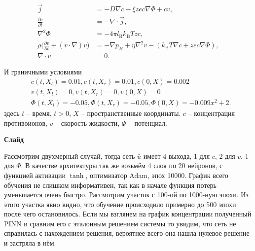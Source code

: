 \documentclass[a4paper,14pt]{extarticle} %
\begin{document}
\begin{equation*}\label{eq:ek_eq}
    \begin{aligned}
        \vec{j}                                             & =
        -D \nabla c - \xi z e c \nabla \Phi + c v,                                    \\
        \frac{\partial c}{\partial t}                                      & =
        -\nabla \cdot\vec{j},                                                         \\
        \nabla^2 \Phi                                       & =
        -4 \pi l_\mathrm{B} k_\mathrm{B}T z c,                                        \\
        \rho \big( \frac{\partial v}{\partial t} + (v \cdot \nabla ) v \big) & =
        -\nabla p_H + \eta \nabla^{2} v - (k_\mathrm{B}T \nabla c + zec \nabla \Phi), \\
        \nabla \cdot v                                      & =
        0.
    \end{aligned}
\end{equation*}

И граничными условиями
\begin{equation*}\label{eq:ek_bnd}
    \begin{aligned}
        &c(t, X_l)    = 0.01, c(t, X_r)    = 0.01, c(0, X)      = 0.002        \\
        &v(t, X_l)    = 0, v(t, X_r)    = 0, v(0, X)      = 0            \\
        &\Phi(t, X_l) = -0.05, \Phi(t, X_r) = -0.05, \Phi(0, X)   = -0.009x^2+2.
    \end{aligned}
\end{equation*}
здесь $t$ -- время, $t>0$, $X$ -- пространственные координаты. $c$ -- концентрация противоионов, $v$ -- скорость жидкости, $\Phi$ -- потенциал. 

\textbf{Слайд}

Рассмотрим двухмерный случай, тогда сеть $\bar{u}$ имеет 4 выхода, 1 для $c$, 2 для $v$, 1 для $\Phi$. В качестве архитектуры так же возьмём 4 слоя по 20 нейронов, с функцией активации $\tanh$, оптимизатор Adam, эпох 10000. График всего обучения не слишком информативен, так как в начале функция потерь уменьшается очень быстро. Рассмотрим участок с 100-ой по 1000-ную эпохи. Из этого участка явно видно, что обучение происходило примерно до 500 эпохи после чего остановилось. Если мы взглянем на график концентрации полученный PINN и сравним его с эталонным решением системы то увидим, что сеть не справилась с нахождением решения, вероятнее всего она нашла нулевое решение и застряла в нём.
\end{document}

